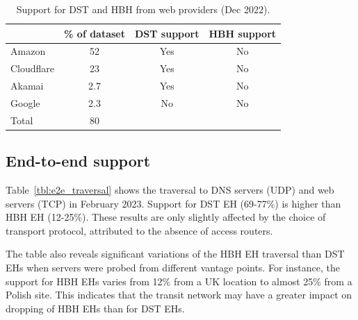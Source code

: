 \documentclass[conference]{IEEEtran}
\begin{document}
\begin{table} 
\centering
\caption{Support for DST and HBH from web providers (Dec 2022).}
\begin{tabular}{l|c|c|c}
           & \% of dataset & DST support & HBH support\\
\hline
\hline
Amazon       & 52                     & Yes                & No                 \\
\hline
Cloudflare   & 23                     & Yes                & No                 \\
\hline
Akamai       & 2.7                    & Yes                & No                 \\
\hline
Google       & 2.3                    & No                 & No                 \\
\hline \hline
Total        & 80
\end{tabular}
\label{tbl:web_providers}
\end{table}


\subsection{End-to-end support}
\label{subsec:e2esupport}

Table~\ref{tbl:e2e_traversal} shows the traversal to 
DNS servers (UDP) and web servers (TCP) in February 2023. Support for DST EH (69-77\%)  
is higher than HBH EH (12-25\%). These results are only slightly affected by the 
choice of transport protocol,  attributed to the
absence of access routers.


The table also reveals significant variations of the HBH EH
traversal than DST EHs when servers were probed from different vantage
points. For instance, the support for HBH EHs varies from 12\% from a UK
location to almost 25\% from a Polish site.  This indicates that the transit
network may have a greater impact on dropping of HBH EHs than for DST EHs.  


\end{document}
